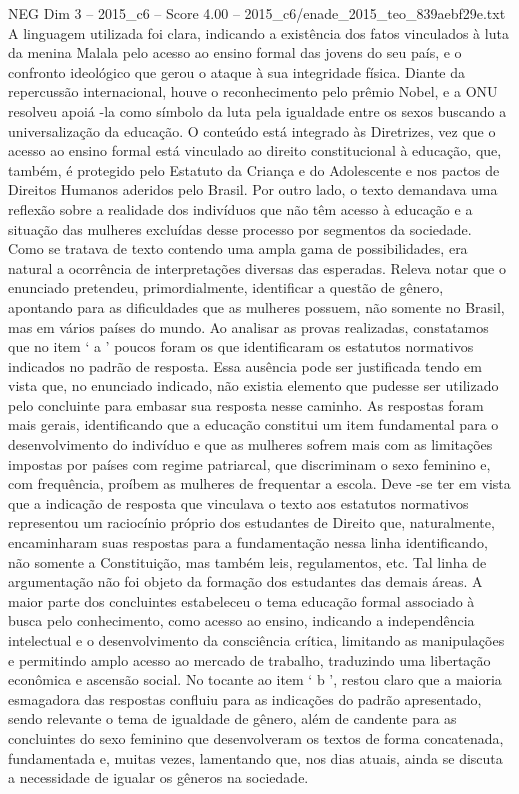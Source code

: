\begin{textsample}{NEG Dim 3 – 2015\_c6 – Score 4.00 – 2015\_c6/enade\_2015\_teo\_839aebf29e.txt}
A linguagem utilizada foi clara, indicando a existência dos fatos vinculados à luta da menina Malala pelo acesso ao ensino formal das jovens do seu país, e o confronto ideológico que gerou o ataque à sua integridade física.
Diante da repercussão internacional, houve o reconhecimento pelo prêmio Nobel, e a ONU resolveu apoiá -la como símbolo da luta pela igualdade entre os sexos buscando a universalização da educação.
O conteúdo está integrado às Diretrizes, vez que o acesso ao ensino formal está vinculado ao direito constitucional à educação, que, também, é protegido pelo Estatuto da Criança e do Adolescente e nos pactos de Direitos Humanos aderidos pelo Brasil.
Por outro lado, o texto demandava uma reflexão sobre a realidade dos indivíduos que não têm acesso à educação e a situação das mulheres excluídas desse processo por segmentos da sociedade.
Como se tratava de texto contendo uma ampla gama de possibilidades, era natural a ocorrência de interpretações diversas das esperadas.
Releva notar que o enunciado pretendeu, primordialmente, identificar a questão de gênero, apontando para as dificuldades que as mulheres possuem, não somente no Brasil, mas em vários países do mundo.
Ao analisar as provas realizadas, constatamos que no item ‘ a ’ poucos foram os que identificaram os estatutos normativos indicados no padrão de resposta.
Essa ausência pode ser justificada tendo em vista que, no enunciado indicado, não existia elemento que pudesse ser utilizado pelo concluinte para embasar sua resposta nesse caminho.
As respostas foram mais gerais, identificando que a educação constitui um item fundamental para o desenvolvimento do indivíduo e que as mulheres sofrem mais com as limitações impostas por países com regime patriarcal, que discriminam o sexo feminino e, com frequência, proíbem as mulheres de frequentar a escola.
Deve -se ter em vista que a indicação de resposta que vinculava o texto aos estatutos normativos representou um raciocínio próprio dos estudantes de Direito que, naturalmente, encaminharam suas respostas para a fundamentação nessa linha identificando, não somente a Constituição, mas também leis, regulamentos, etc.
Tal linha de argumentação não foi objeto da formação dos estudantes das demais áreas.
A maior parte dos concluintes estabeleceu o tema educação formal associado à busca pelo conhecimento, como acesso ao ensino, indicando a independência intelectual e o desenvolvimento da consciência crítica, limitando as manipulações e permitindo amplo acesso ao mercado de trabalho, traduzindo uma libertação econômica e ascensão social.
No tocante ao item ‘ b ’, restou claro que a maioria esmagadora das respostas confluiu para as indicações do padrão apresentado, sendo relevante o tema de igualdade de gênero, além de candente para as concluintes do sexo feminino que desenvolveram os textos de forma concatenada, fundamentada e, muitas vezes, lamentando que, nos dias atuais, ainda se discuta a necessidade de igualar os gêneros na sociedade.

\end{textsample}
